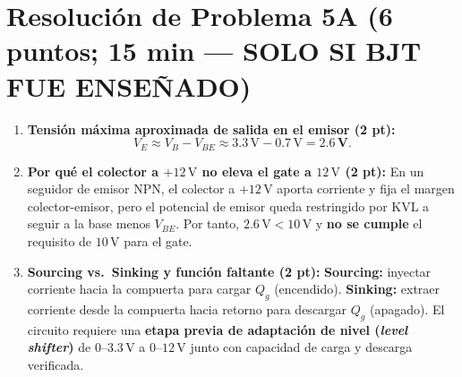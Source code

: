 \documentclass[11pt, a4paper]{article}
\begin{document}
\section*{Resolución de Problema 5A (6 puntos; 15 min — SOLO SI BJT FUE ENSEÑADO)}
\begin{enumerate}[label=\arabic*., noitemsep, topsep=2pt]
    \item \textbf{Tensión máxima aproximada de salida en el emisor (2 pt):}
    \[
        V_E \approx V_B - V_{BE} \approx 3.3\,\text{V} - 0.7\,\text{V} = \mathbf{2.6\,\text{V}}.
    \]
    \item \textbf{Por qué el colector a $+12\,\text{V}$ no eleva el gate a $12\,\text{V}$ (2 pt):} En un seguidor de emisor NPN, el colector a $+12\,\text{V}$ aporta corriente y fija el margen colector-emisor, pero el potencial de emisor queda restringido por KVL a seguir a la base menos $V_{BE}$. Por tanto, $2.6\,\text{V} < 10\,\text{V}$ y \textbf{no se cumple} el requisito de $10\,\text{V}$ para el gate.
    \item \textbf{Sourcing vs.\ Sinking y función faltante (2 pt):} \textbf{Sourcing:} inyectar corriente hacia la compuerta para cargar $Q_g$ (encendido). \textbf{Sinking:} extraer corriente desde la compuerta hacia retorno para descargar $Q_g$ (apagado). El circuito requiere una \textbf{etapa previa de adaptación de nivel (\textit{level shifter})} de $0\text{--}3.3\,\text{V}$ a $0\text{--}12\,\text{V}$ junto con capacidad de carga y descarga verificada.
\end{enumerate}
\end{document}
